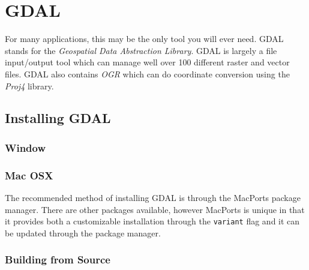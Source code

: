 %


\section*{GDAL}

For many applications, this may be the only tool you will ever need.  GDAL
stands for the \emph{Geospatial Data Abstraction Library}.  GDAL is largely 
a file input/output tool which can manage well over 100 different raster and vector
files.  GDAL also contains \emph{OGR} which can do coordinate conversion
using the \emph{Proj4} library.



\subsection*{Installing GDAL}


\subsubsection*{Window}



\subsubsection*{Mac OSX}

The recommended method of installing GDAL is through the MacPorts package manager.
There are other packages available, however MacPorts is unique in that it provides both a customizable
installation through the \texttt{variant} flag and it can be updated through
the package manager.


\subsubsection*{Building from Source}

